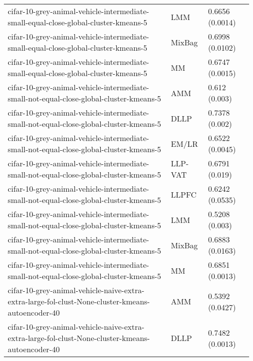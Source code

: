 \begin{longtable}{lll}
                          cifar-10-grey-animal-vehicle-intermediate-small-equal-close-global-cluster-kmeans-5 &       LMM &                           0.6656 (0.0014) \\
                          cifar-10-grey-animal-vehicle-intermediate-small-equal-close-global-cluster-kmeans-5 &    MixBag &                           0.6998 (0.0102) \\
                          cifar-10-grey-animal-vehicle-intermediate-small-equal-close-global-cluster-kmeans-5 &        MM &                           0.6747 (0.0015) \\
                      cifar-10-grey-animal-vehicle-intermediate-small-not-equal-close-global-cluster-kmeans-5 &       AMM &                             0.612 (0.003) \\
                      cifar-10-grey-animal-vehicle-intermediate-small-not-equal-close-global-cluster-kmeans-5 &      DLLP &                            0.7378 (0.002) \\
                      cifar-10-grey-animal-vehicle-intermediate-small-not-equal-close-global-cluster-kmeans-5 &     EM/LR &                           0.6522 (0.0045) \\
                      cifar-10-grey-animal-vehicle-intermediate-small-not-equal-close-global-cluster-kmeans-5 &   LLP-VAT &                            0.6791 (0.019) \\
                      cifar-10-grey-animal-vehicle-intermediate-small-not-equal-close-global-cluster-kmeans-5 &     LLPFC &                           0.6242 (0.0535) \\
                      cifar-10-grey-animal-vehicle-intermediate-small-not-equal-close-global-cluster-kmeans-5 &       LMM &                            0.5208 (0.003) \\
                      cifar-10-grey-animal-vehicle-intermediate-small-not-equal-close-global-cluster-kmeans-5 &    MixBag &                           0.6883 (0.0163) \\
                      cifar-10-grey-animal-vehicle-intermediate-small-not-equal-close-global-cluster-kmeans-5 &        MM &                           0.6851 (0.0013) \\
            cifar-10-grey-animal-vehicle-naive-extra-extra-large-fol-clust-None-cluster-kmeans-autoencoder-40 &       AMM &                           0.5392 (0.0427) \\
            cifar-10-grey-animal-vehicle-naive-extra-extra-large-fol-clust-None-cluster-kmeans-autoencoder-40 &      DLLP &                           0.7482 (0.0013) \\

\end{longtable}
